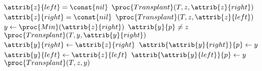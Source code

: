 \begin{codebox}
\li \If $\attrib{z}{left} = \const{nil}$
\li \Then
        $\proc{Transplant}(T,z,\attrib{z}{right})$
\li \ElseIf $\attrib{z}{right} = \const{nil}$
\li	\Then
     	$\proc{Transplant}(T,z,\attrib{z}{left})$
\li \Else
\li     $y \gets \proc{Min}(\attrib{z}{right})$
\li     \If $\attrib{y}{p} \neq z$
\li     \Then
            $\proc{Transplant}(T, y, \attrib{y}{right})$
\li         $\attrib{y}{right} \gets \attrib{z}{right}$
\li         $\attrib{\attrib{y}{right}}{p} \gets y$
        \End
\li     $\attrib{y}{left} \gets \attrib{z}{left}$
\li     $\attrib{\attrib{y}{left}}{p} \gets y$
\li     $\proc{Transplant}(T,z,y)$
    \End
\end{codebox}